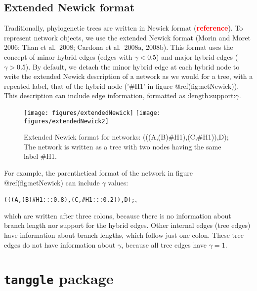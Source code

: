 \documentclass[]{IEEEtran}
\begin{document}
\vspace{-0.25cm}

\hypertarget{extended-newick-format}{%
\subsection{Extended Newick format}\label{extended-newick-format}}

Traditionally, phylogenetic trees are written in Newick format
(\textcolor{red}{\textbf{reference}}). To represent network objects, we
use the extended Newick format (Morin and Moret 2006; Than et al.~2008;
Cardona et al.~2008a, 2008b). This format uses the concept of minor
hybrid edges (edges with \(\gamma < 0.5\)) and major hybrid edges
(\(\gamma > 0.5\)). By default, we detach the minor hybrid edge at each
hybrid node to write the extended Newick description of a network as we
would for a tree, with a repeated label, that of the hybrid node ('\#H1'
in figure @ref(fig:netNewick)). This description can include edge
information, formatted as :length:support:\(\gamma\).

\begin{figure}

{\centering \texttt{[image: figures/extendedNewick]} \texttt{[image: figures/extendedNewick2]} 

}

\caption{Extended Newick format for networks: (((A,(B)\#H1),(C,\#H1)),D); The network is written as a tree with two nodes having the same label \#H1.}\label{fig:netNewick}
\end{figure}

For example, the parenthetical format of the network in figure
@ref(fig:netNewick) can include \(\gamma\) values:

\texttt{(((A,(B)\#H1:::0.8),(C,\#H1:::0.2)),D);},

which are written after three colons, because there is no information
about branch length nor support for the hybrid edges. Other internal
edges (tree edges) have information about branch lengths, which follow
just one colon. These tree edges do not have information about
\(\gamma\), because all tree edges have \(\gamma=1\).

\hypertarget{tanggle-package}{%
\section{\texorpdfstring{\texttt{tanggle}
package}{tanggle package}}\label{tanggle-package}}
\end{document}
